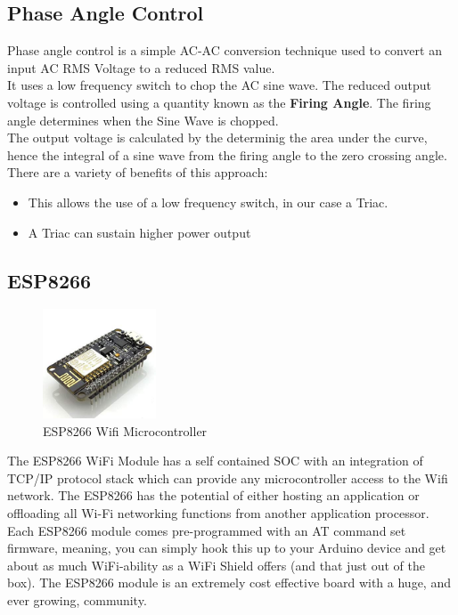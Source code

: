         \subsection{Phase Angle Control}
        	Phase angle control is a simple AC-AC conversion technique used to convert an input AC RMS Voltage to a reduced RMS value.\\
        	It uses a low frequency switch to chop the AC sine wave. The reduced output voltage is controlled using a quantity known as the \textbf{Firing Angle}. The firing angle determines when the Sine Wave is chopped.\\
        	The output voltage is calculated by the determinig the area under the curve, hence the integral of a sine wave from the firing angle to the zero crossing angle.\\
        	There are a variety of benefits of this approach:
        	\begin{itemize}
        		\item This allows the use of a low frequency switch, in our case a Triac.
        		\item A Triac can sustain higher power output
        	\end{itemize}
        	
        
    \subsection{ESP8266}
        \begin{figure}
        	\includegraphics[width=0.3\textwidth]{photos/theory/esp8266.jpg}
        	\caption{ESP8266 Wifi Microcontroller}
        \end{figure}
    
        The ESP8266 WiFi Module has a self contained SOC with an integration of TCP/IP protocol stack which can provide any microcontroller access to the Wifi network. The ESP8266 has the potential of either hosting an application or offloading all Wi-Fi networking functions from another application processor. Each ESP8266 module comes pre-programmed with an AT command set firmware, meaning, you can simply hook this up to your Arduino device and get about as much WiFi-ability as a WiFi Shield offers (and that just out of the box). The ESP8266 module is an extremely cost effective board with a huge, and ever growing, community.\\
        
